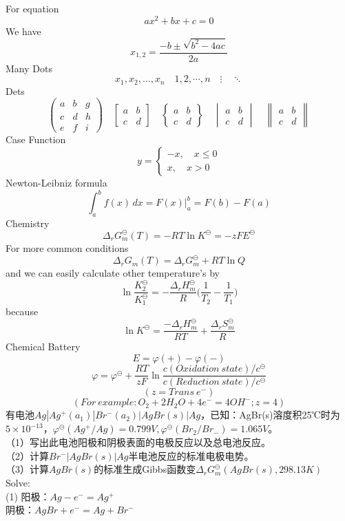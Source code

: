 \documentclass[UTF8]{ctexart}
\begin{document}
For equation
\[ax^2+bx+c=0\]
We have
\[x_{1,2}=\frac{-b\pm \sqrt{b^2-4ac}}{2a}\]
Many Dots
\[ x_1,x_2,\dots ,x_n\quad 1,2,\cdots ,n\quad
\vdots\quad \ddots \]
Dets
\[ \begin{pmatrix} a&b&g\\c&d&h\\e&f&i \end{pmatrix} \quad
\begin{bmatrix} a&b\\c&d \end{bmatrix} \quad
\begin{Bmatrix} a&b\\c&d \end{Bmatrix} \quad
\begin{vmatrix} a&b\\c&d \end{vmatrix} \quad
\begin{Vmatrix} a&b\\c&d \end{Vmatrix} \]
Case Function
\[ y= \begin{cases}
    -x,\quad x\leq 0 \\
    x,\quad x>0
    \end{cases} \]
Newton-Leibniz formula
\[\int_{a}^{b} f(x) \,dx=F(x)|^b_a=F(b)-F(a) \]
Chemistry
\[\Delta _rG_m^\ominus (T)=-RT\ln K^\ominus=-zFE^\ominus \]
For more common conditions
\[\Delta _rG_m(T)=\Delta _rG_m^\ominus+RT\ln Q\]
and we can easily calculate other temperature's by
\[\ln \frac{K_2^\ominus}{K_1^\ominus}=-\frac{\Delta_rH_m^\ominus}{R}\Big(\frac{1}{T_2}-\frac{1}{T_1}\Big)\]
because
\[\ln K^\ominus=\frac{-\Delta_rH_m^\ominus}{RT}+\frac{\Delta_rS_m^\ominus}{R}\]
Chemical Battery
\[E=\varphi (+)-\varphi (-)\]
\[\varphi=\varphi^\ominus+\frac{RT}{zF}\ln\frac{c(Oxidation\ state)/c^\ominus}{c(Reduction\ state)/c^\ominus}\]
\[(z=Trans\ e^-)\]
\[(For\ example:O_2+2H_2O+4e^-=4OH^-;z=4)\]
\newpage
有电池$Ag|Ag^+(a_1)|Br^-(a_2)|AgBr(s)|Ag$，已知：AgBr(s)溶度积25℃时为$5\times10^{-13}$，$\varphi^\ominus(Ag^+/Ag)=0.799V, \varphi^\ominus(Br_2/Br_-)=1.065V$。\\
（1）写出此电池阳极和阴极表面的电极反应以及总电池反应。\\
（2）计算$Br^-|AgBr(s)|Ag$半电池反应的标准电极电势。\\
（3）计算$AgBr(s)$的标准生成Gibbs函数变$\Delta_rG_m^\ominus(AgBr(s),298.13K)$\\
Solve:\\(1)
阳极：$Ag-e^-=Ag^+$\\
阴极：$AgBr+e^-=Ag+Br^-$\\
\end{document}
